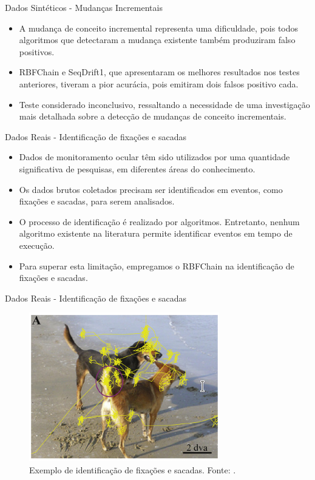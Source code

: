\documentclass[10pt]{beamer}
\begin{document}
\begin{frame}{Dados Sintéticos -  Mudanças Incrementais}
    \begin{itemize}
        \item A mudança de conceito incremental representa uma dificuldade, pois todos algoritmos que detectaram a mudança existente também produziram falso positivos.
        \item RBFChain e SeqDrift1, que apresentaram os melhores resultados nos testes anteriores, tiveram a pior acurácia, pois emitiram dois falsos positivo cada.
        \item Teste considerado inconclusivo, ressaltando a necessidade de uma investigação mais detalhada sobre a detecção de mudanças de conceito incrementais.
    \end{itemize}
\end{frame}

\begin{frame}{Dados Reais - Identificação de fixações e sacadas}
    \begin{itemize}
        \item Dados de monitoramento ocular têm sido utilizados por uma quantidade significativa de pesquisas, em diferentes áreas do conhecimento.
        \item Os dados brutos coletados precisam ser identificados em eventos, como fixações e sacadas, para serem analisados.
        \item O processo de identificação é realizado por algoritmos. Entretanto, nenhum algoritmo existente na literatura permite identificar eventos em tempo de execução.
        \item Para superar esta limitação, empregamos o RBFChain na identificação de fixações e sacadas.
    \end{itemize}
\end{frame}

\begin{frame}{Dados Reais - Identificação de fixações e sacadas}
    \begin{figure}[H]
        \begin{center}
            \includegraphics[scale=1]{imagens/exemplo_fixacao_e_sacadas.png}
            \caption{Exemplo de identificação de fixações e sacadas. Fonte: \cite{KONIG2014121}.}
            \label{fig:exemplo_fixacoes_e_sacadas}
        \end{center}
    \end{figure}
\end{frame}
\end{document}
